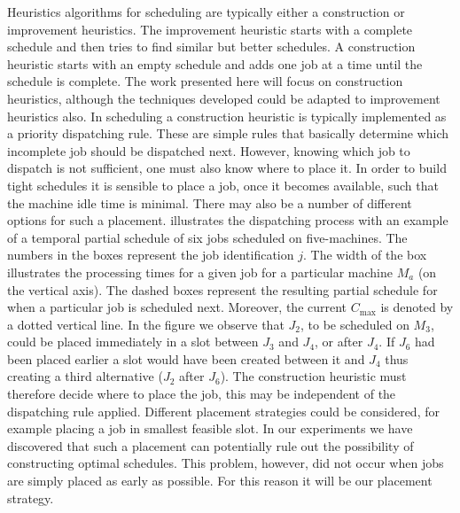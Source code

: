 \documentclass[smallextended]{svjour3}
\begin{document}
Heuristics algorithms for scheduling are typically either a
construction or improvement heuristics. The improvement heuristic
starts with a complete schedule and then tries to find similar but
better schedules.  A construction heuristic starts with an empty
schedule and adds one job at a time until the schedule is complete.
The work presented here will focus on construction heuristics,
although the techniques developed could be adapted to improvement
heuristics also. In scheduling a construction heuristic is typically
implemented as a priority dispatching rule. These are simple rules
that basically determine which incomplete job should be dispatched
next. However, knowing which job to dispatch is not sufficient, one
must also know where to place it. In order to build tight schedules it
is sensible to place a job, once it becomes available, such that
the machine idle time is minimal. There may also be a number of
different options for such a placement. 
illustrates the dispatching process with an example of a temporal
partial schedule of six jobs scheduled on five-machines. The numbers
in the boxes represent the job identification $j$. The width of the
box illustrates the processing times for a given job for a particular
machine $M_a$ (on the vertical axis). The dashed boxes represent the
resulting partial schedule for when a particular job is scheduled
next. Moreover, the current $C_{\max}$ is denoted by a dotted vertical
line. In the figure we observe that $J_2$, to be scheduled on $M_3$,
could be placed immediately in a slot between $J_3$ and $J_4$, or after
$J_4$. If $J_6$ had been placed earlier a slot would
have been created between it and $J_4$ thus creating a third
alternative ($J_2$ after $J_6$). The construction heuristic must
therefore decide where to place the job, this may be independent of
the dispatching rule applied. Different placement strategies could be
considered, for example placing a job in smallest feasible slot. In
our experiments we have discovered that such a placement can
potentially rule out the possibility of constructing optimal
schedules. This problem, however, did not occur when jobs are simply
placed as early as possible. For this reason it will be our placement strategy.
	
\end{document}
